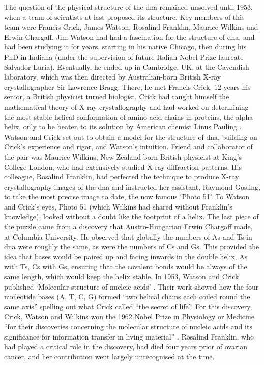 The question of the physical structure of the \gls{dna} remained unsolved until 1953, when a team of scientists at last proposed its structure. 
Key members of this team were Francis Crick, James Watson, Rosalind Franklin, Maurice Wilkins and Erwin Chargaff. 
Jim Watson had had a fascination for the structure of \gls{dna}, and had been studying it for years, starting in his native Chicago, then during his PhD in Indiana (under the supervision of future Italian Nobel Prize laureate Salvador Luria).
Eventually, he ended up in Cambridge, UK, at the Cavendish laboratory, which was then directed by Australian-born British X-ray crystallographer Sir Lawrence Bragg. 
There, he met Francis Crick, 12 years his senior, a British physicist turned biologist. 
Crick had taught himself the mathematical theory of X-ray crystallography and had worked on determining the most stable helical conformation of amino acid chains in proteins, the alpha helix, only to be beaten to its solution by American chemist Linus Pauling \cite{pauling1951structure}. 
Watson and Crick set out to obtain a model for the structure of \gls{dna}, building on Crick’s experience and rigor, and Watson’s intuition. 
Friend and collaborator of the pair was Maurice Wilkins, New Zealand-born British physicist at King’s College London, who had extensively studied X-ray diffraction patterns. 
His colleague, Rosalind Franklin, had perfected the technique to produce X-ray crystallography images of the \gls{dna} and instructed her assistant, Raymond Gosling, to take the most precise image to date, the now famous `Photo 51'. 
To Watson and Crick’s eyes, Photo 51 (which Wilkins had shared without Franklin's knowledge), looked without a doubt like the footprint of a helix. 
The last piece of the puzzle came from a discovery that Austro-Hungarian Erwin Chargaff made, at Columbia University. 
He observed that globally the numbers of As and Ts in \gls{dna} were roughly the same, as were the numbers of Cs and Gs. 
This provided the idea that bases would be paired up and facing inwards in the double helix, As with Ts, Cs with Gs, ensuring that the covalent bonds would be always of the same length, which would keep the helix stable. 
In 1953, Watson and Crick published `Molecular structure of nucleic acids' \cite{watson1953molecular}. 
Their work showed how the four nucleotide bases (A, T, C, G) formed “two helical chains each coiled round the same axis” \cite{watson1953molecular} spelling out what Crick called “the secret of life”. 
For this discovery, Crick, Watson and Wilkins won the 1962 Nobel Prize in Physiology or Medicine “for their discoveries concerning the molecular structure of nucleic acids and its significance for information transfer in living material” \cite{nobel1962nobel}. 
Rosalind Franklin, who had played a critical role in the discovery, had died four years prior of ovarian cancer, and her contribution went largely unrecognised at the time.

